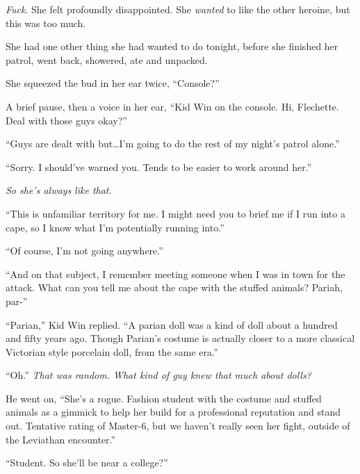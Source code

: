 \emph{Fuck}.  She felt profoundly disappointed.  She \emph{wanted} to like the other heroine, but this was too much.



She had one other thing she had wanted to do tonight, before she finished her patrol, went back, showered, ate and unpacked.



She squeezed the bud in her ear twice, ``Console?''



A brief pause, then a voice in her ear, ``Kid Win on the console.  Hi, Flechette.  Deal with those guys okay?''



``Guys are dealt with but\ldots I'm going to do the rest of my night's patrol alone.''



``Sorry.  I should've warned you.  Tends to be easier to work around her.''



\emph{So she's always like that}.



``This is unfamiliar territory for me. I might need you to brief me if I run into a cape, so I know what I'm potentially running into.''



``Of course, I'm not going anywhere.''



``And on that subject, I remember meeting someone when I was in town for the attack.  What can you tell me about the cape with the stuffed animals?  Pariah, par-''



``Parian,'' Kid Win replied.  ``A parian doll was a kind of doll about a hundred and fifty years ago.  Though Parian's costume is actually closer to a more classical Victorian style porcelain doll, from the same era.''



``Oh.''  \emph{That was random.  What kind of guy knew that much about dolls?}



He went on, ``She's a rogue.  Fashion student with the costume and stuffed animals as a gimmick to help her build for a professional reputation and stand out.  Tentative rating of Master-6, but we haven't really seen her fight, outside of the Leviathan encounter.''



``Student.  So she'll be near a college?''



